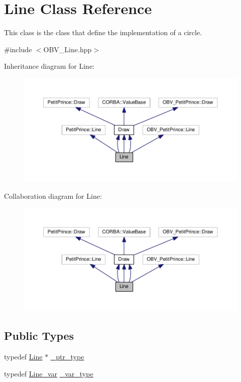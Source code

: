\hypertarget{class_line}{}\section{Line Class Reference}
\label{class_line}


This class is the class that define the implementation of a circle.  




{\ttfamily \#include $<$O\+B\+V\+\_\+\+Line.\+hpp$>$}



Inheritance diagram for Line\+:
\nopagebreak
\begin{figure}[H]
\begin{center}
\leavevmode
\includegraphics[width=350pt]{class_line__inherit__graph}
\end{center}
\end{figure}


Collaboration diagram for Line\+:
\nopagebreak
\begin{figure}[H]
\begin{center}
\leavevmode
\includegraphics[width=350pt]{class_line__coll__graph}
\end{center}
\end{figure}
\subsection*{Public Types}
\begin{DoxyCompactItemize}
\item 
typedef \hyperlink{class_line}{Line} $\ast$ \hyperlink{class_line_a886875fa295d09a973b952a38d791975}{\+\_\+ptr\+\_\+type}
\item 
typedef \hyperlink{_petit_prince_8hpp_a90bd71cc9b7ba07b75cd943d99dbc8a6}{Line\+\_\+var} \hyperlink{class_line_a65425cec92e3b0b955728581d07ac83b}{\+\_\+var\+\_\+type}
\end{DoxyCompactItemize}
